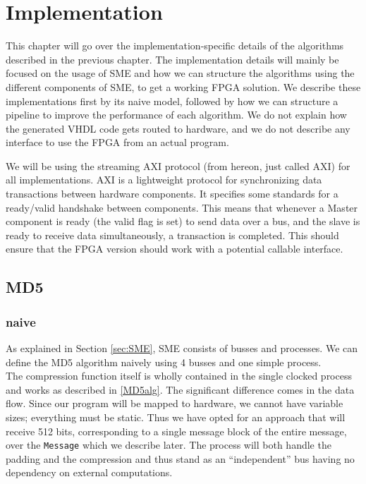 \documentclass[a4paper, openany]{book}
\begin{document}
\chapter{Implementation}
\label{sec:org341b71c}
This chapter will go over the implementation-specific details of the algorithms described in the previous chapter. The implementation details will mainly be focused on the usage of SME and how we can structure the algorithms using the different components of SME, to get a working FPGA solution. We describe these implementations first by its naive model, followed by how we can structure a pipeline to improve the performance of each algorithm. We do not explain how the generated VHDL code gets routed to hardware, and we do not describe any interface to use the FPGA from an actual program.

We will be using the streaming AXI protocol\cite{AMBAaxi} (from hereon, just called AXI) for all implementations. AXI is a lightweight protocol for synchronizing data transactions between hardware components. It specifies some standards for a ready/valid handshake between components. This means that whenever a Master component is ready (the valid flag is set) to send data over a bus, and the slave is ready to receive data simultaneously, a transaction is completed. This should ensure that the FPGA version should work with a potential callable interface.
\section{MD5}
\label{sec:org62230f7}
\subsection{naive}
\label{MD5naive}
As explained in Section \ref{sec:SME}, SME consists of busses and processes. We can define the MD5 algorithm naively using 4 busses and one simple process.\\

The compression function itself is wholly contained in the single clocked process and works as described in \ref{MD5alg}. The significant difference comes in the data flow. Since our program will be mapped to hardware, we cannot have variable sizes; everything must be static. Thus we have opted for an approach that will receive 512 bits, corresponding to a single message block of the entire message, over the \texttt{Message} which we describe later. The process will both handle the padding and the compression and thus stand as an ``independent'' bus having no dependency on external computations.
\end{document}
